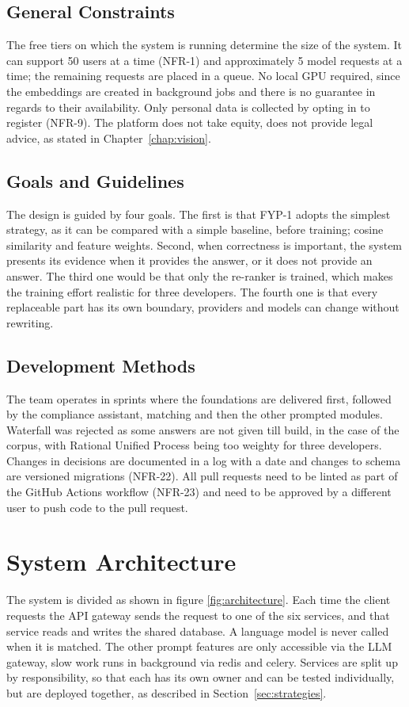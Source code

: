 \documentclass{FastFyp}
\begin{document}
\subsection{General Constraints}
The free tiers on which the system is running determine the size of the system. It can support 50 users at a time (NFR-1) and approximately 5 model requests at a time; the remaining requests are placed in a queue. No local GPU required, since the embeddings are created in background jobs and there is no guarantee in regards to their availability. Only personal data is collected by opting in to register (NFR-9). The platform does not take equity, does not provide legal advice, as stated in Chapter~\ref{chap:vision}.

\subsection{Goals and Guidelines}\label{sec:goals-guidelines}
The design is guided by four goals. The first is that FYP-1 adopts the simplest strategy, as it can be compared with a simple baseline, before training; cosine similarity and feature weights. Second, when correctness is important, the system presents its evidence when it provides the answer, or it does not provide an answer. The third one would be that only the re-ranker is trained, which makes the training effort realistic for three developers. The fourth one is that every replaceable part has its own boundary, providers and models can change without rewriting.

\subsection{Development Methods}
The team operates in sprints where the foundations are delivered first, followed by the compliance assistant, matching and then the other prompted modules. Waterfall was rejected as some answers are not given till build, in the case of the corpus, with Rational Unified Process being too weighty for three developers. Changes in decisions are documented in a log with a date and changes to schema are versioned migrations (NFR-22). All pull requests need to be linted as part of the GitHub Actions workflow (NFR-23) and need to be approved by a different user to push code to the pull request.

\section{System Architecture}
The system is divided as shown in figure \ref{fig:architecture}. Each time the client requests the API gateway sends the request to one of the six services, and that service reads and writes the shared database. A language model is never called when it is matched. The other prompt features are only accessible via the LLM gateway, slow work runs in background via redis and celery. Services are split up by responsibility, so that each has its own owner and can be tested individually, but are deployed together, as described in Section~\ref{sec:strategies}.
\end{document}
